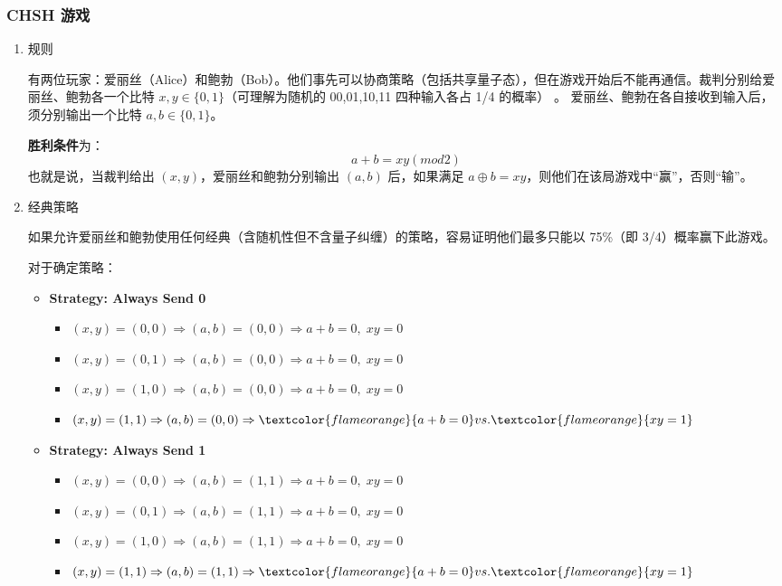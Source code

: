 \subsubsection{CHSH 游戏}
\begin{enumerate}
	\item 规则
	
	有两位玩家：爱丽丝（Alice）和鲍勃（Bob）。他们事先可以协商策略（包括共享量子态），但在游戏开始后不能再通信。裁判分别给爱丽丝、鲍勃各一个比特 \( x, y \in \{0,1\} \)（可理解为随机的 00,01,10,11 四种输入各占 1/4 的概率） 。 爱丽丝、鲍勃在各自接收到输入后，须分别输出一个比特 \( a, b \in \{0,1\} \)。
	
	\textbf{胜利条件}为：
	$$ a + b = xy(mod2)   $$
	也就是说，当裁判给出 \((x,y)\)，爱丽丝和鲍勃分别输出 \((a,b)\) 后，如果满足 \(a \oplus b = x y\)，则他们在该局游戏中“赢”，否则“输”。
	
	\item 经典策略
	
	如果允许爱丽丝和鲍勃使用任何经典（含随机性但不含量子纠缠）的策略，容易证明他们最多只能以 75\%（即 3/4）概率赢下此游戏。
	
	对于确定策略：
	\begin{itemize}
		\item \textbf{Strategy: Always Send 0}
		\begin{itemize}
			\item $(x, y) = (0, 0) \Rightarrow (a, b) = (0, 0) \Rightarrow a + b = 0, \; xy = 0$
			\item $(x, y) = (0, 1) \Rightarrow (a, b) = (0, 0) \Rightarrow a + b = 0, \; xy = 0$
			\item $(x, y) = (1, 0) \Rightarrow (a, b) = (0, 0) \Rightarrow a + b = 0, \; xy = 0$
			\item $(x, y) = (1, 1) \Rightarrow (a, b) = (0, 0) \Rightarrow \textcolor{flameorange}{a + b = 0} vs. \textcolor{flameorange}{xy = 1}$
		\end{itemize}
		
		\item \textbf{Strategy: Always Send 1}
		\begin{itemize}
			\item $(x, y) = (0, 0) \Rightarrow (a, b) = (1, 1) \Rightarrow a + b = 0, \; xy = 0$
			\item $(x, y) = (0, 1) \Rightarrow (a, b) = (1, 1) \Rightarrow a + b = 0, \; xy = 0$
			\item $(x, y) = (1, 0) \Rightarrow (a, b) = (1, 1) \Rightarrow a + b = 0, \; xy = 0$
			\item $(x, y) = (1, 1) \Rightarrow (a, b) = (1, 1) \Rightarrow \textcolor{flameorange}{a + b = 0} vs. \textcolor{flameorange}{xy = 1}$
		\end{itemize}
		

\end{itemize}
\end{enumerate}
